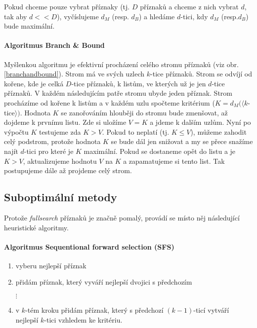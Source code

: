 Pokud chceme pouze vybrat příznaky (tj. $D$ příznaků a chceme z nich vybrat $d$, tak aby $d<<D$), vyčíslujeme
$d_M$ (resp. $d_B$) a hledáme $d$-tici, kdy $d_M$ (resp.$d_B$) bude maximální.

\paragraph{Algoritmus Branch \& Bound}
Myšlenkou algoritmu je efektivní procházení celého stromu příznaků (viz obr. \ref{branchandbound}). Strom má ve 
svých uzlech $k$-tice příznaků. Strom se odvíjí od kořene, kde je celká $D$-tice příznaků, k listům, ve kterých už je jen
 $d$-tice příznaků. V každém následujícím patře stromu ubyde jeden příznak. Strom procházíme od kořene k listům
 a v každém uzlu spočteme kritérium ($K=d_M(\langle k$-tice$\rangle)$. Hodnota $K$ se zanořováním hlouběji do stromu bude zmenšovat, až
 dojdeme k prvnímu listu. Zde si uložíme $V=K$ a jdeme k dalším uzlům. Nyní po výpočtu $K$ testujeme zda $K>V$. Pokud
 to neplatí (tj. $K\leq V$), můžeme zahodit celý podstrom, protože hodnota $K$ se bude dál jen snižovat a my se 
 přece snažíme najít $d$-tici pro které je $K$ maximální. Pokud se dostaneme opět do listu a je $K>V$, 
 aktualizujeme hodnotu $V$ na $K$ a zapamatujeme si tento list. Tak postupujeme dále až projdeme celý strom.
 
 


\subsection{Suboptimální metody}
Protože {\em fullsearch} příznaků je značně pomalý, provádí se místo něj následující heuristické algoritmy.

\paragraph{Algoritmus Sequentional forward selection (SFS)}
\begin{enumerate}
\item vyberu nejlepší příznak
\item přidám příznak, který vyváří nejlepší dvojici s předchozím
\item[$\vdots$]
\item v $k$-tém kroku přidám příznak, který s předchozí $(k-1)$-ticí vytváří nejlepší $k$-tici vzhledem ke kritériu.
\end{enumerate}

